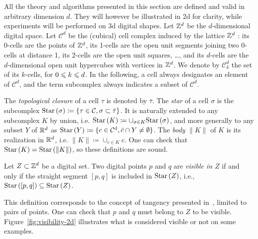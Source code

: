     All the theory and algorithms presented in this section are
    defined and valid in arbitrary dimension $d$. They will however be
    illustrated in 2d for clarity, while experiments will be
    performed on 3d digital shapes.  Let $\mathbb{Z}^d$ be the $d$-dimensional
    digital space.  Let $\mathcal{C}^d$ be the (cubical) cell complex
    induced by the lattice $\mathbb{Z}^d$ : its 0-cells are the points of
    $\mathbb{Z}^d$, its 1-cells are the open unit segments joining two 0-cells
    at distance 1, its 2-cells are the open unit squares, \ldots, and
    its $d$-cells are the $d$-dimensional open unit hypercubes with
    vertices in $\mathbb{Z}^d$.  We denote by $\mathcal{C}^d_k$ the set of its
    $k$-cells, for $0 \leqslant k \leqslant d$.  In the following, a cell always
    designates an element of $\mathcal{C}^d$, and the term subcomplex
    always indicates a subset of $\mathcal{C}^d$.

    The \emph{topological closure} of a cell $\tau$ is denoted by
    $\bar{\tau}$. The \emph{star} of a cell $\sigma$ is the subcomplex
    $\mathrm{Star}\left(\sigma\right)\coloneqq\{\tau \in \mathcal{C}, \sigma \subset \bar{\tau}
    \}$. It is naturally extended to any subcomplex $K$ by union,
    i.e. $\mathrm{Star}\left(K\right) \coloneqq \cup_{\sigma \in K} \mathrm{Star}\left(\sigma\right)$, and more
    generally to any subset $Y$ of $\mathbb{R}^d$ as $\mathrm{Star}\left(Y\right)\coloneqq\{ c \in \operatorname{\mathcal{C}^d},
    \bar{c} \cap Y \neq \emptyset \}$. The \emph{body} $\|K\|$ of $K$
    is its realization in $\mathbb{R}^d$, i.e. $\|K\|\coloneqq\cup_{c \in K} c$. One
    can check that $\mathrm{Star}\left(K\right)=\mathrm{Star}\left(\|K\|\right)$, so these definitions are
    sound.

    \begin{definition}[Visibility]
      Let $Z \subset \mathbb{Z}^d$ be a digital set. Two digital points $p$
      and $q$ are \emph{visible in $Z$} if and only if the straight
      segment $[p, q]$ is included in $\mathrm{Star}\left(Z\right)$, i.e., $\mathrm{Star}\left([p, q]\right)
      \subseteq \mathrm{Star}\left(Z\right)$.
    \end{definition}
    This definition corresponds to the concept of tangency presented
    in~\cite{lachaud:2022-jmiv}, limited to pairs of points. One can
    check that $p$ and $q$ must belong to $Z$ to be visible.
    Figure~\ref{fig:visibility-2d} illustrates what is considered
    visible or not on some examples.


